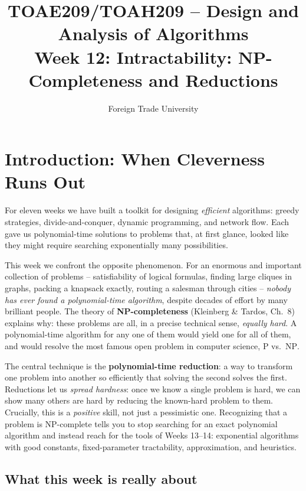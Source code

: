 \documentclass[11pt]{article}
\title{TOAE209/TOAH209 -- Design and Analysis of Algorithms\\[4pt]
\large Week 12: Intractability: NP-Completeness and Reductions}
\author{Foreign Trade University}
\date{}
\begin{document}
\maketitle
\tableofcontents

\section{Introduction: When Cleverness Runs Out}

For eleven weeks we have built a toolkit for designing \emph{efficient} algorithms:
greedy strategies, divide-and-conquer, dynamic programming, and network flow. Each gave
us polynomial-time solutions to problems that, at first glance, looked like they might
require searching exponentially many possibilities.

This week we confront the opposite phenomenon. For an enormous and important collection of
problems -- satisfiability of logical formulas, finding large cliques in graphs, packing a
knapsack exactly, routing a salesman through cities -- \emph{nobody has ever found a
polynomial-time algorithm}, despite decades of effort by many brilliant people. The theory
of \textbf{NP-completeness} (Kleinberg \& Tardos, Ch.\ 8) explains why: these problems are
all, in a precise technical sense, \emph{equally hard}. A polynomial-time algorithm for any
one of them would yield one for all of them, and would resolve the most famous open problem
in computer science, $\mathrm{P}$ vs.\ $\mathrm{NP}$.

The central technique is the \textbf{polynomial-time reduction}: a way to transform one
problem into another so efficiently that solving the second solves the first. Reductions
let us \emph{spread hardness}: once we know a single problem is hard, we can show many
others are hard by reducing the known-hard problem to them. Crucially, this is a
\emph{positive} skill, not just a pessimistic one. Recognizing that a problem is
NP-complete tells you to stop searching for an exact polynomial algorithm and instead reach
for the tools of Weeks 13--14: exponential algorithms with good constants, fixed-parameter
tractability, approximation, and heuristics.

\subsection{What this week is really about}
\end{document}
